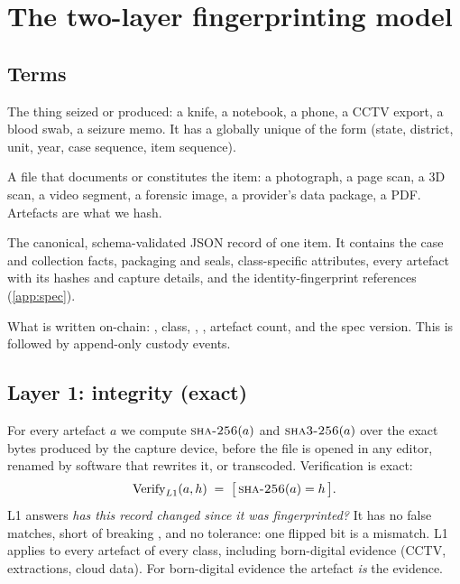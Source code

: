 \section{The two-layer fingerprinting model}
\label{sec:twolayer}

\subsection{Terms}
\begin{description}[style=nextline,leftmargin=1.2em]
  \item[Evidence item.] The thing seized or produced: a knife, a notebook, a phone, a CCTV export, a blood swab, a seizure memo. It has a globally unique  of the form  (state, district, unit, year, case sequence, item sequence).
  \item[Artefact.] A file that documents or constitutes the item: a photograph, a page scan, a 3D scan, a video segment, a forensic image, a provider's data package, a PDF. Artefacts are what we hash.
  \item[Manifest.] The canonical, schema-validated JSON record of one item. It contains the case and collection facts, packaging and seals, class-specific attributes, every artefact with its hashes and capture details, and the identity-fingerprint references (\cref{app:spec}).
  \item[Ledger record.] What is written on-chain: , class, , , artefact count, and the spec version. This is followed by append-only custody events.
\end{description}

\subsection{Layer 1: integrity (exact)}
For every artefact $a$ we compute $\textsc{sha-256}(a)$ and $\textsc{sha3-256}(a)$ over the exact bytes produced by the capture device, before the file is opened in any editor, renamed by software that rewrites it, or transcoded. Verification is exact:
\[
\mathrm{Verify}_{L1}(a, h) \;=\; \big[\,\textsc{sha-256}(a) = h\,\big].
\]
L1 answers \emph{has this record changed since it was fingerprinted?} It has no false matches, short of breaking \shatwo{}, and no tolerance: one flipped bit is a mismatch. L1 applies to every artefact of every class, including born-digital evidence (CCTV, extractions, cloud data). For born-digital evidence the artefact \emph{is} the evidence.

